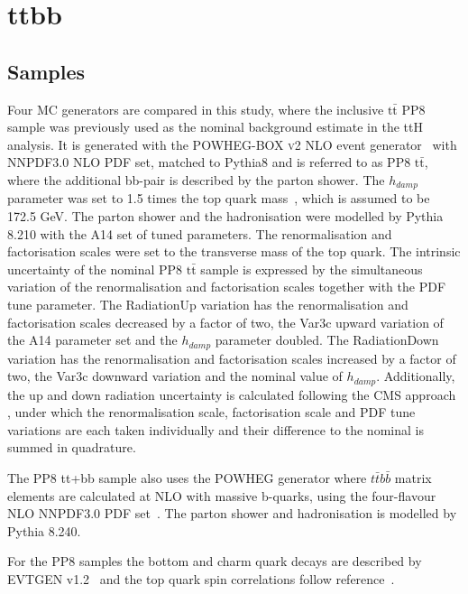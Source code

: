 \section{ttbb}
\label{sec:ttbb}

\subsection{Samples}
Four MC generators are compared in this study, where the inclusive $\mathrm{t\bar{t}}$ PP8 sample was previously used as the nominal background estimate in the ttH analysis. It is generated with the \textsc{POWHEG-BOX v2} NLO event generator~\cite{Nason:2004rx,Frixione:2007vw,Alioli:2010xd,Campbell:2014kua} with NNPDF3.0 NLO PDF set, matched to Pythia8 and is referred to as PP8 $\mathrm{t\bar{t}}$, where the additional bb-pair is described by the parton shower. The $h_{damp}$ parameter was set to 1.5 times the top quark mass~\cite{ATL-PHYS-PUB-2016-020}, which is assumed to be 172.5 GeV. The parton shower and the hadronisation were modelled by Pythia 8.210 with the A14 set of tuned parameters. The renormalisation and factorisation scales were set to the transverse mass of the top quark.
The intrinsic uncertainty of the nominal PP8 $\mathrm{t\bar{t}}$ sample is expressed by the simultaneous variation of the renormalisation and factorisation scales together with the PDF tune parameter. The RadiationUp variation has the renormalisation and factorisation scales decreased by a factor of two, the Var3c upward variation of the A14 parameter set and the $h_{damp}$ parameter doubled. The RadiationDown variation has the renormalisation and factorisation scales increased by a factor of two, the Var3c downward variation and the nominal value of $h_{damp}$.
Additionally, the up and down radiation uncertainty is calculated following the CMS approach , under which the renormalisation scale, factorisation scale and PDF tune variations are each taken individually and their difference to the nominal is summed in quadrature.

The PP8 tt+bb sample also uses the POWHEG generator where $t\bar{t}b\bar{b}$ matrix elements are calculated at NLO with massive b-quarks, using the four-flavour NLO NNPDF3.0 PDF set~\cite{Jezo:2018yaf}. The parton shower and hadronisation is modelled by Pythia 8.240.

For the PP8 samples the bottom and charm quark decays are described by EVTGEN v1.2~\cite{LANGE2001152} and the top quark spin correlations follow reference~\cite{Frixione:2007zp}.

